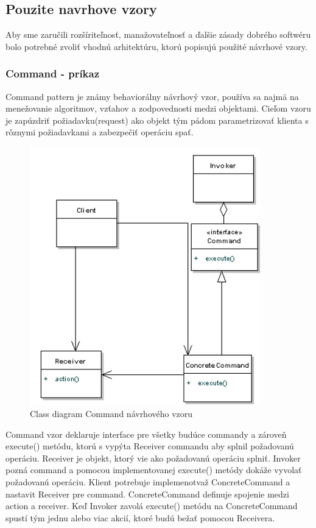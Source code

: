 \subsection{Pouzite navrhove vzory}
Aby sme zaručili rozšíriteľnosť, manažovateľnosť a ďalšie zásady dobrého softwéru bolo potrebné zvoliť vhodnú arhitektúru, ktorú popisujú použité návrhové vzory.
\subsubsection{Command - príkaz}
\indent Command pattern je známy behaviorálny návrhový vzor, používa sa najmä na menežovanie algoritmov, vzťahov a zodpovednosti medzi objektami. 
Cieľom vzoru je zapúzdriť požiadavku(request) ako objekt tým pádom parametrizovať klienta s rôznymi požiadavkami a zabezpečiť operáciu spať.
\begin{figure}[!htbp]
	\centering
	\includegraphics[width=10cm]{img/command_pattern_class.jpg}
	\caption{Class diagram Command návrhového vzoru}
	\label{fig:test}
\end{figure}
\newline
Command vzor deklaruje interface pre všetky budúce commandy a zároveň execute() metódu, ktorú s vypýta Receiver commandu aby splnil požadovanú operáciu.
Receiver je objekt, ktorý vie ako požadovanú operáciu splniť. Invoker pozná command a pomocou implementovanej execute() metódy dokáže vyvolať požadovanú operáciu.
Klient potrebuje implemenotvaž ConcreteCommand a nastavit Receiver pre command. ConcreteCommand definuje spojenie medzi action a receiver. Keď Invoker zavolá execute() metódu na ConcreteCommand spustí tým jednu alebo viac akcií, ktoré budú bežať pomocou Receivera.

